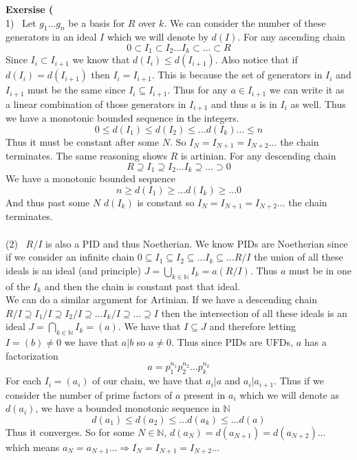 \documentclass[12pt]{article}
\newenvironment{ques}[1]{\textbf{Exersise #1}\vspace{1 mm}\\ }{\bigskip}
\theoremstyle{definition}
\newcommand{\N}{\mathbb N}
\begin{document}
\begin{ques}{7.5}
	(1) \ Let $g_1 \dots g_n$ be a basis for $R$ over $k$. We can consider the
	number of these generators in an ideal $I$ which we will denote by $d(I)$.
	For any ascending chain
	$$0 \subset I_1 \subset I_2 \dots I_k \subset \dots \subset R$$
	Since $I_i \subset I_{i+1}$ we know that $d(I_i) \leq d(I_{i+1})$. Also
	notice that if $d(I_i) = d(I_{i+1})$ then $I_i = I_{i+1}$. This is because
	the set of generators in $I_i$ and $I_{i+1}$ must be the same since $I_i
	\subseteq I_{i+1}$. Thus for any $a \in I_{i + 1}$ we can write it as a
	linear combination of those generators in $I_{i+1}$ and thus $a$ is in
	$I_i$ as well. Thus we have a monotonic bounded sequence in the integers.
	$$0 \leq d(I_1) \leq d(I_2) \leq \dots d(I_k) \dots \leq n$$
	Thus it must be constant after some $N$. So $I_N = I_{N+1} = I_{N+2} \dots $ 
	the chain terminates. The same reasoning shows $R$ is artinian. For any
	descending chain
	$$R \supseteq I_1 \supseteq I_2 \dots I_k \supseteq  \dots \supset 0$$
	We have a monotonic bounded sequence
	$$n \geq d(I_1) \geq \dots d(I_k) \geq \dots 0$$
	And thus past some $N$ $d(I_k)$ is constant so $I_N = I_{N+1} = I_{N+2} \dots$
	the chain terminates.\\
	\\
	(2) \ $R/I$ is also a PID and thus Noetherian. We know PIDs are Noetherian
	since if we consider an infinite chain $0 \subseteq I_1 \subseteq I_2
	\subseteq \dots I_k \subseteq \dots R/I$ the union of all these ideals is an
	ideal (and principle) $J = \bigcup_{k \in \N} I_k = a(R/I)$. Thus $a$ must
	be in one of the $I_k$ and then the chain is constant past that ideal.\\
	We can do a similar argument for Artinian. If we have a descending chain
	$R/I \supseteq I_1/I \supseteq I_2/I \supseteq \dots I_k/I \supseteq \dots
	\supseteq I$ then the intersection of all these ideals is an ideal $J=
	\bigcap_{k\in\N} I_k = (a)$. We have that $I \subseteq J$ and therefore letting
	$I = (b) \neq 0$ we have that $a | b$ so $a \neq 0$. Thus since PIDs are
	UFDs, $a$ has a factorization 
	$$a = p_1^{n_1}p_2^{n_2} \dots p_k^{n_k}$$
	For each $I_i = (a_i)$ of our chain, we have that $a_i | a$ and $a_i |
	a_{i+1}$. Thus if we consider the number of prime factors of $a$ present in
	$a_i$ which we will denote as $d(a_i)$, we have a bounded monotonic
	sequence in $\N$
	$$d(a_1) \leq d(a_2) \leq \dots d(a_k) \leq \dots d(a)$$
	Thus it converges. So for some $N \in \N$, $d(a_N) = d(a_{N+1}) =
	d(a_{N+2}) \dots$ which means $a_N = a_{N+1} \dots  \Rightarrow I_N =
	I_{N+1} = I_{N+2} \dots $
\end{ques}
\end{document}

